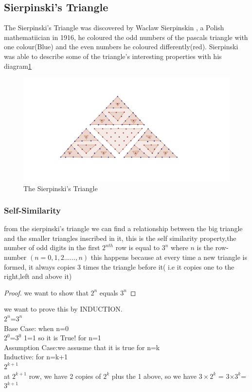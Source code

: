 \documentclass[10pt,a4paper]{article}
\newtheorem{proof}[theorem]{proof}
\begin{document}
\subsection{Sierpinski's Triangle}
The Sierpinski's Triangle was discovered by Waclaw Sierpinskin , a Polish mathematiician in 1916, he coloured the odd numbers of the pascals triangle with one colour(Blue) and the even numbers he coloured differently(red)\cite{siep}. Sierpinski was able to describe some of the triangle's interesting properties with his diagram\ref{odds}
\begin{figure}[h!]\label{odds}
\centering
\includegraphics[scale=0.3]{Triangle.png}
	
\caption{The Sierpinski's Triangle}
\end{figure}

\subsubsection{Self-Similarity }
from the sierpinski's triangle we can find a relationship between the big triangle and the smaller triangles inscribed in it, this is the self similarity property,the number of odd digits in the first $2^{nth}$ row is equal to $3^{n}$ where $n$ is the row-number $(n=0,1,2......,n)$ this happens because at every time a new triangle is formed, it always copies 3 times the triangle before it( i.e it copies one to the right,left and above it)\cite{selfs}
\begin{proof}
we want to show that $2^{n}$ equals $3^{n}$
\end{proof}
we want to prove this by INDUCTION.\\
$2^{n}$=$3^{n}$\\
Base Case: when n=0\\
$2^{0}$=$3^{0}$
1=1
so it is True! for n=1\\
Assumption Case:we assusme that it is true for n=k\\
Inductive: for n=k+1\\
$2^{k+1}$\\
at $2^{k+1}$ row, we have 2 copies of $2^{k}$ plus the 1 above, so we have $3\times$$2^{k}$ = 3$\times3^{k}$=$3^{k+1}$
\end{document}
